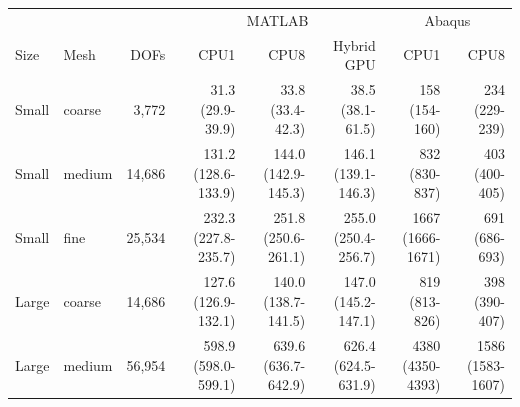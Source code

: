 \begin{table}[!htbp]
\centering\small
\setlength{\tabcolsep}{3pt}
\renewcommand{\arraystretch}{1.12}
\begin{tabular}{@{}llrrrrrr@{}}
\toprule
& & & \multicolumn{3}{c}{MATLAB} & \multicolumn{2}{c}{Abaqus} \\
\cmidrule(lr){4-6}\cmidrule(lr){7-8}
Size & Mesh & DOFs & CPU1 & CPU8 & Hybrid GPU & CPU1 & CPU8 \\
\midrule
Small & coarse & 3,772 & \shortstack[r]{31.3\\(29.9-39.9)} & \shortstack[r]{33.8\\(33.4-42.3)} & \shortstack[r]{38.5\\(38.1-61.5)} & \shortstack[r]{158\\(154-160)} & \shortstack[r]{234\\(229-239)} \\[3pt]
Small & medium & 14,686 & \shortstack[r]{131.2\\(128.6-133.9)} & \shortstack[r]{144.0\\(142.9-145.3)} & \shortstack[r]{146.1\\(139.1-146.3)} & \shortstack[r]{832\\(830-837)} & \shortstack[r]{403\\(400-405)} \\[3pt]
Small & fine & 25,534 & \shortstack[r]{232.3\\(227.8-235.7)} & \shortstack[r]{251.8\\(250.6-261.1)} & \shortstack[r]{255.0\\(250.4-256.7)} & \shortstack[r]{1667\\(1666-1671)} & \shortstack[r]{691\\(686-693)} \\[3pt]
\midrule
Large & coarse & 14,686 & \shortstack[r]{127.6\\(126.9-132.1)} & \shortstack[r]{140.0\\(138.7-141.5)} & \shortstack[r]{147.0\\(145.2-147.1)} & \shortstack[r]{819\\(813-826)} & \shortstack[r]{398\\(390-407)} \\[3pt]
Large & medium & 56,954 & \shortstack[r]{598.9\\(598.0-599.1)} & \shortstack[r]{639.6\\(636.7-642.9)} & \shortstack[r]{626.4\\(624.5-631.9)} & \shortstack[r]{4380\\(4350-4393)} & \shortstack[r]{1586\\(1583-1607)} \\[3pt]

\end{tabular}
\end{table}
